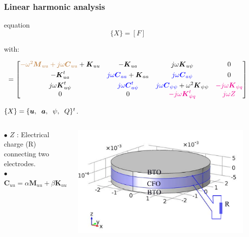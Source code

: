 \documentclass[compress]{beamer}
\begin{document}
\begin{frame}\frametitle{Linear harmonic analysis}
\begin{beamercolorbox}[center]{equation}
      \begin{equation*}
		[\mathbb{K}] \{ X \}=[F]
		\end{equation*}
\end{beamercolorbox}
with:
\begin{itemize} [label=$\bullet$, font=\small, leftmargin=*]
{\small
\item  \begin{equation*} 
[\mathbb{K}] = \begin{bmatrix}
       {\color{brown}-\omega^2\boldsymbol{M}_{uu} + j\omega\boldsymbol{C}_{uu}} + \boldsymbol{K}_{uu} & - \boldsymbol{K}_{ua} & j\omega\boldsymbol{K}_{u\psi} & 0\\[0.3em]
       -\boldsymbol{K}_{ua}^t & {\color{blue}j\omega\boldsymbol{C}_{aa}} + \boldsymbol{K}_{aa} & {\color{blue}j\omega\boldsymbol{C}_{a\psi}} & 0 \\[0.3em]
       j\omega\boldsymbol{K}_{u\psi}^t & {\color{blue}j\omega\boldsymbol{C}_{a\psi}^t} & {\color{blue}j\omega\boldsymbol{C}_{\psi \psi}} + \omega^2\boldsymbol{K}_{\psi \psi} & {\color{magenta}-j\omega\boldsymbol{K}_{\psi q}} \\
       0 & 0 & {\color{magenta}-j\omega\boldsymbol{K}_{\psi q}^t} & {\color{magenta}j\omega Z}
\end{bmatrix}
\end{equation*}
}
\item $\{ X \} = \{\boldsymbol{u},\hspace{0.2cm} \boldsymbol{a},\hspace{0.2cm} \psi,\hspace{0.2cm} Q \}^t$.
\end{itemize}
\begin{columns}[totalwidth=\textwidth] 
	\begin{column}{.5\textwidth}  
$\bullet$ $Z$ : Electrical charge (R) connecting two electrodes. \\
$\bullet$ $ \boldsymbol{C}_{uu} = \alpha \boldsymbol{M}_{uu} + \beta \boldsymbol{K}_{uu} $
	\end{column}
	\begin{column}{.45\textwidth}  
\includegraphics[width=0.95\textwidth]{Graphic/01_geoMEcircu.pdf}

\end{column}
\end{columns}
\end{frame}
\end{document}
